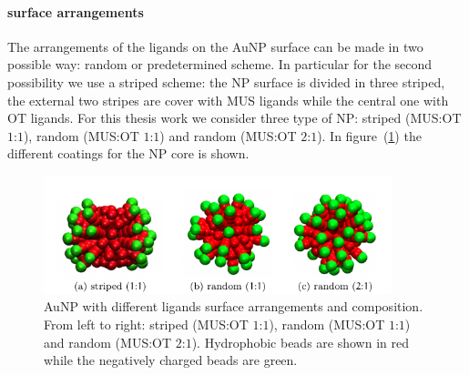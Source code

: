 \paragraph{\textbf{surface arrangements}} The arrangements of the ligands on the Au\ac{NP} surface can be made in two possible way: random or predetermined scheme. In particular for the second possibility we use a striped scheme: the \ac{NP} surface is divided in three striped, the external two stripes are cover with \ac{MUS} ligands while the central one with \ac{OT} ligands. For this thesis work we consider three type of \ac{NP}: striped (\ac{MUS}:\ac{OT} $1$:$1$), random (\ac{MUS}:\ac{OT} $1$:$1$) and random (\ac{MUS}:\ac{OT} $2$:$1$). In figure~(\ref{fig:coating}) the different coatings for the \ac{NP} core is shown.

\begin{figure}[!ht]
	\centering
	\includegraphics[width=0.9\textwidth]{./img/coatings/coat}
	\caption{Au\acs{NP} with different ligands surface arrangements and composition. From left to right: striped (\ac{MUS}:\ac{OT} $1$:$1$), random (\ac{MUS}:\ac{OT} $1$:$1$) and random (\ac{MUS}:\ac{OT} $2$:$1$). Hydrophobic beads are shown in red while the negatively charged beads are green.}
	\label{fig:coating}
\end{figure}



